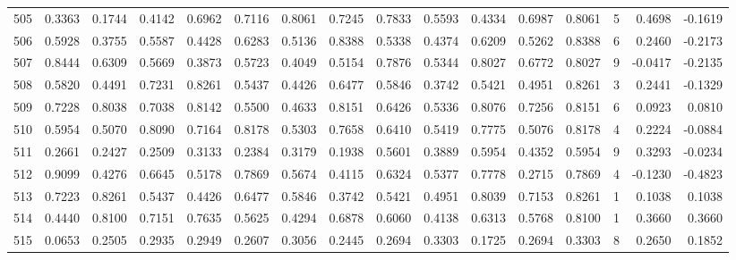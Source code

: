 \begin{tabular}{lrrrrrrrrrrrrrrr}
505 &      0.3363 &  0.1744 &  0.4142 &  0.6962 &  0.7116 &  0.8061 &  0.7245 &  0.7833 &  0.5593 &  0.4334 &   0.6987 &     0.8061 &      5 &                    0.4698 &                    -0.1619 \\
506 &      0.5928 &  0.3755 &  0.5587 &  0.4428 &  0.6283 &  0.5136 &  0.8388 &  0.5338 &  0.4374 &  0.6209 &   0.5262 &     0.8388 &      6 &                    0.2460 &                    -0.2173 \\
507 &      0.8444 &  0.6309 &  0.5669 &  0.3873 &  0.5723 &  0.4049 &  0.5154 &  0.7876 &  0.5344 &  0.8027 &   0.6772 &     0.8027 &      9 &                   -0.0417 &                    -0.2135 \\
508 &      0.5820 &  0.4491 &  0.7231 &  0.8261 &  0.5437 &  0.4426 &  0.6477 &  0.5846 &  0.3742 &  0.5421 &   0.4951 &     0.8261 &      3 &                    0.2441 &                    -0.1329 \\
509 &      0.7228 &  0.8038 &  0.7038 &  0.8142 &  0.5500 &  0.4633 &  0.8151 &  0.6426 &  0.5336 &  0.8076 &   0.7256 &     0.8151 &      6 &                    0.0923 &                     0.0810 \\
510 &      0.5954 &  0.5070 &  0.8090 &  0.7164 &  0.8178 &  0.5303 &  0.7658 &  0.6410 &  0.5419 &  0.7775 &   0.5076 &     0.8178 &      4 &                    0.2224 &                    -0.0884 \\
511 &      0.2661 &  0.2427 &  0.2509 &  0.3133 &  0.2384 &  0.3179 &  0.1938 &  0.5601 &  0.3889 &  0.5954 &   0.4352 &     0.5954 &      9 &                    0.3293 &                    -0.0234 \\
512 &      0.9099 &  0.4276 &  0.6645 &  0.5178 &  0.7869 &  0.5674 &  0.4115 &  0.6324 &  0.5377 &  0.7778 &   0.2715 &     0.7869 &      4 &                   -0.1230 &                    -0.4823 \\
513 &      0.7223 &  0.8261 &  0.5437 &  0.4426 &  0.6477 &  0.5846 &  0.3742 &  0.5421 &  0.4951 &  0.8039 &   0.7153 &     0.8261 &      1 &                    0.1038 &                     0.1038 \\
514 &      0.4440 &  0.8100 &  0.7151 &  0.7635 &  0.5625 &  0.4294 &  0.6878 &  0.6060 &  0.4138 &  0.6313 &   0.5768 &     0.8100 &      1 &                    0.3660 &                     0.3660 \\
515 &      0.0653 &  0.2505 &  0.2935 &  0.2949 &  0.2607 &  0.3056 &  0.2445 &  0.2694 &  0.3303 &  0.1725 &   0.2694 &     0.3303 &      8 &                    0.2650 &                     0.1852 \\

\end{tabular}
